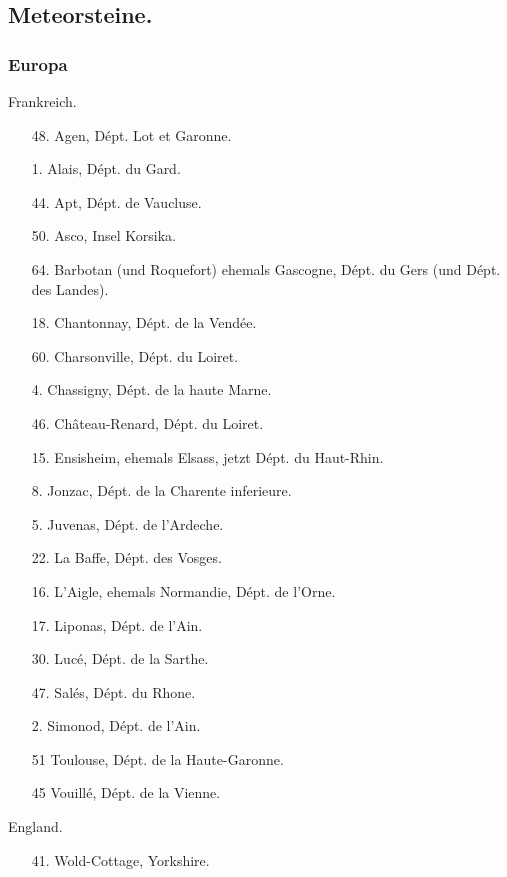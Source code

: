 \documentclass[a4paper, 11pt, oneside, polutonikogreek, german]{article}
\begin{document}
\subsection{Meteorsteine.}
\subsubsection{Europa}
\begin{center}
Frankreich.
\end{center}
\begin{itemize}
    \small
    \item[48.] Agen, Dépt. Lot et Garonne.
    \item[1.] Alais, Dépt. du Gard.
    \item[44.] Apt, Dépt. de Vaucluse.
    \item[50.] Asco, Insel Korsika.
    \item[64.] Barbotan (und Roquefort) ehemals Gascogne, Dépt. du Gers (und Dépt. des Landes).
    \item[18.] Chantonnay, Dépt. de la Vendée.
    \item[60.] Charsonville, Dépt. du Loiret.
    \item[4.] Chassigny, Dépt. de la haute Marne.
    \item[46.] Château-Renard, Dépt. du Loiret.
    \item[15.] Ensisheim, ehemals Elsass, jetzt Dépt. du Haut-Rhin.
    \item[8.] Jonzac, Dépt. de la Charente inferieure.
    \item[5.] Juvenas, Dépt. de l'Ardeche.
    \item[22.] La Baffe, Dépt. des Vosges.
    \item[16.] L'Aigle, ehemals Normandie, Dépt. de l'Orne.
    \item[17.] Liponas, Dépt. de l'Ain.
    \item[30.] Lucé, Dépt. de la Sarthe.
    \item[47.] Salés, Dépt. du Rhone.
    \item[2.] Simonod, Dépt. de l'Ain.
    \item[51] Toulouse, Dépt. de la Haute-Garonne.
    \item[45] Vouillé, Dépt. de la Vienne.
\end{itemize}
\begin{center}
England.
\end{center}
\begin{itemize}
    \small
    \item[41.] Wold-Cottage, Yorkshire.
\end{itemize}
\end{document}
